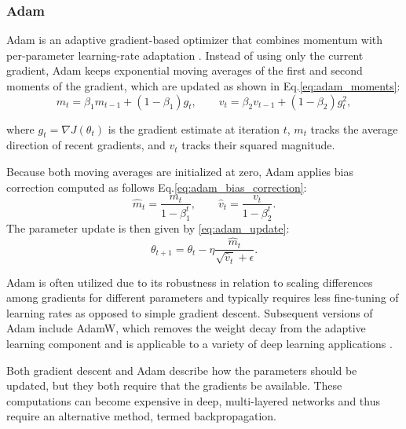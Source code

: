 \subsubsection{Adam}

Adam is an adaptive gradient-based optimizer that combines momentum with per-parameter learning-rate adaptation \cite{kingma2015}. Instead of using only the current gradient, Adam keeps exponential moving averages of the first and second moments of the gradient, which are updated as shown in Eq.\eqref{eq:adam_moments}:
\begin {equation}
    \label{eq:adam_moments}
    m_t = \beta_1 m_{t-1} + (1-\beta_1)g_t,
    \qquad
    v_t = \beta_2 v_{t-1} + (1-\beta_2)g_t^2,
\end{equation}

where $g_t=\nabla J(\theta_t)$ is the gradient estimate at iteration $t$, $m_t$ tracks the average direction of recent gradients, and $v_t$ tracks their squared magnitude.

Because both moving averages are initialized at zero, Adam applies bias correction computed as follows Eq.\eqref{eq:adam_bias_correction}:
\begin{equation}
    \label{eq:adam_bias_correction}
    \hat{m}_t = \frac{m_t}{1-\beta_1^t},
    \qquad
    \hat{v}_t = \frac{v_t}{1-\beta_2^t}.
\end{equation}
The parameter update is then given by \eqref{eq:adam_update}:
\begin{equation}
    \label{eq:adam_update}
    \theta_{t+1}
    =
    \theta_t
    -
    \eta \frac{\hat{m}_t}{\sqrt{\hat{v}_t}+\epsilon}.
\end{equation}

Adam is often utilized due to its robustness in relation to scaling differences among gradients for different parameters and typically requires less fine-tuning of learning rates as opposed to simple gradient descent. Subsequent versions of Adam include AdamW, which removes the weight decay from the adaptive learning component and is applicable to a variety of deep learning applications \cite{Loshchilov2019}.



Both gradient descent and Adam describe how the parameters should be updated, but they both require that the gradients be available. These computations can become expensive in deep, multi-layered networks and thus require an alternative method, termed backpropagation.